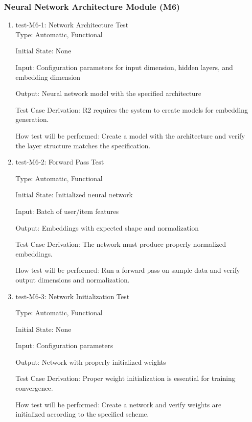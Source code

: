 \documentclass[12pt, titlepage]{article}
\begin{document}
\subsubsection{Neural Network Architecture Module (M6)}

\begin{enumerate}

\item{test-M6-1: Network Architecture Test\\}
Type: Automatic, Functional
					
Initial State: None
					
Input: Configuration parameters for input dimension, hidden layers, and embedding dimension
					
Output: Neural network model with the specified architecture

Test Case Derivation: R2 requires the system to create models for embedding generation.

How test will be performed: Create a model with the architecture and verify the layer structure matches the specification.

\item{test-M6-2: Forward Pass Test\\}

Type: Automatic, Functional

Initial State: Initialized neural network

Input: Batch of user/item features

Output: Embeddings with expected shape and normalization

Test Case Derivation: The network must produce properly normalized embeddings.

How test will be performed: Run a forward pass on sample data and verify output dimensions and normalization.

\item{test-M6-3: Network Initialization Test}

Type: Automatic, Functional

Initial State: None

Input: Configuration parameters

Output: Network with properly initialized weights

Test Case Derivation: Proper weight initialization is essential for training convergence.

How test will be performed: Create a network and verify weights are initialized according to the specified scheme.


\end{enumerate}
\end{document}
